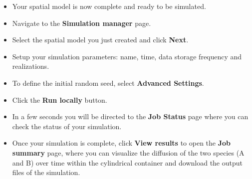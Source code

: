 \begin{itemize}
\item Your spatial model is now complete and ready to be simulated.

\item Navigate to the \textbf{Simulation manager} page.

\item Select the spatial model you just created and click \textbf{Next}.
\item Setup your simulation parameters: name, time, data storage frequency and realizations. 
\item To define the initial random seed, select \textbf{Advanced Settings}.
\item Click the \textbf{Run locally} button.
\item In a few seconds you will be directed to the \textbf{Job Status} page where you can check the status of your simulation.
\item Once your simulation is complete, click \textbf{View results} to open the \textbf{Job summary} page, where you can visualize the diffusion of the two species (A and B) over time within the cylindrical container and download the output files of the simulation.

\end{itemize}



